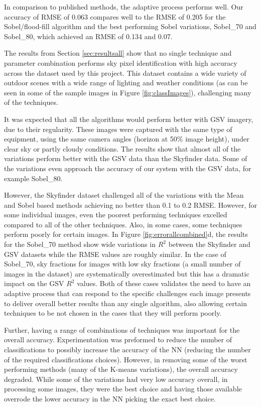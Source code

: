 \documentclass[final,3p,times,authoryear]{elsarticle}
\begin{document}
In comparison to published methods, the adaptive process performs well. Our accuracy of RMSE of 0.063 compares well to the RMSE of 0.205 for the \cite{Middel2018} Sobel/flood-fill algorithm and the best performing \cite{Wang2015a} Sobel variations, Sobel\_70 and Sobel\_80, which achieved an RMSE of 0.134 and 0.07.

The results from Section \ref{sec:resultsall} show that no single technique and parameter combination performs sky pixel identification with high accuracy across the dataset used by this project. This dataset contains a wide variety of outdoor scenes with a wide range of lighting and weather conditions (as can be seen in some of the sample images in Figure \ref{fig:classImages}), challenging many of the techniques. 

It was expected that all the algorithms would perform better with GSV imagery, due to their regularity. These images were captured with the same type of equipment, using the same camera angles (horizon at 50\% image height), under clear sky or partly cloudy conditions. The results show that almost all of the variations perform better with the GSV data than the Skyfinder data. Some of the variations even approach the accuracy of our system with the GSV data, for example Sobel\_80. 

However, the Skyfinder dataset challenged all of the variations with the Mean and Sobel based methods achieving no better than 0.1 to 0.2 RMSE. However, for some individual images, even the poorest performing techniques excelled compared to all of the other techniques. Also, in some cases, some techniques perform poorly for certain images. In Figure \ref{fig:errorallcombined}d, the results for the Sobel\_70 method show wide variations in $R^{2}$ between the Skyfinder and GSV datasets while the RMSE values are roughly similar. In the case of Sobel\_70, sky fractions for images with low sky fractions (a small number of images in the dataset) are systematically overestimated but this has a dramatic impact on the GSV $R^{2}$ values. Both of these cases validates the need to have an adaptive process that can respond to the specific challenges each image presents to deliver overall better results than any single algorithm, also allowing certain techniques to be not chosen in the cases that they will perform poorly.

Further, having a range of combinations of techniques was important for the overall accuracy. Experimentation was preformed to reduce the number of classifications to possibly increase the accuracy of the NN (reducing the number of the required classifications choices). However, in removing some of the worst performing methods (many of the K-means variations), the overall accuracy degraded. While some of the variations had very low accuracy overall, in processing some images, they were the best choice and having those available overrode the lower accuracy in the NN picking the exact best choice.
\end{document}
